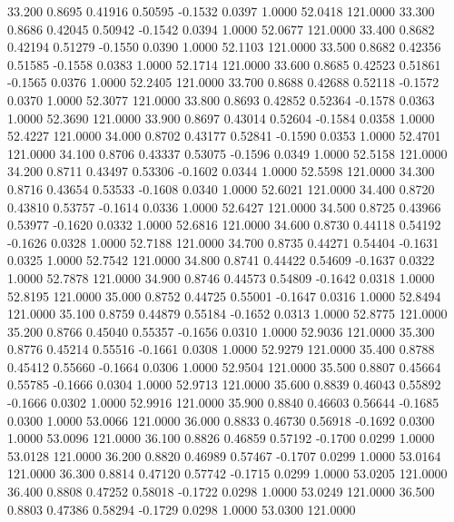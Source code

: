   33.200   0.8695   0.41916   0.50595  -0.1532   0.0397   1.0000  52.0418 121.0000
  33.300   0.8686   0.42045   0.50942  -0.1542   0.0394   1.0000  52.0677 121.0000
  33.400   0.8682   0.42194   0.51279  -0.1550   0.0390   1.0000  52.1103 121.0000
  33.500   0.8682   0.42356   0.51585  -0.1558   0.0383   1.0000  52.1714 121.0000
  33.600   0.8685   0.42523   0.51861  -0.1565   0.0376   1.0000  52.2405 121.0000
  33.700   0.8688   0.42688   0.52118  -0.1572   0.0370   1.0000  52.3077 121.0000
  33.800   0.8693   0.42852   0.52364  -0.1578   0.0363   1.0000  52.3690 121.0000
  33.900   0.8697   0.43014   0.52604  -0.1584   0.0358   1.0000  52.4227 121.0000
  34.000   0.8702   0.43177   0.52841  -0.1590   0.0353   1.0000  52.4701 121.0000
  34.100   0.8706   0.43337   0.53075  -0.1596   0.0349   1.0000  52.5158 121.0000
  34.200   0.8711   0.43497   0.53306  -0.1602   0.0344   1.0000  52.5598 121.0000
  34.300   0.8716   0.43654   0.53533  -0.1608   0.0340   1.0000  52.6021 121.0000
  34.400   0.8720   0.43810   0.53757  -0.1614   0.0336   1.0000  52.6427 121.0000
  34.500   0.8725   0.43966   0.53977  -0.1620   0.0332   1.0000  52.6816 121.0000
  34.600   0.8730   0.44118   0.54192  -0.1626   0.0328   1.0000  52.7188 121.0000
  34.700   0.8735   0.44271   0.54404  -0.1631   0.0325   1.0000  52.7542 121.0000
  34.800   0.8741   0.44422   0.54609  -0.1637   0.0322   1.0000  52.7878 121.0000
  34.900   0.8746   0.44573   0.54809  -0.1642   0.0318   1.0000  52.8195 121.0000
  35.000   0.8752   0.44725   0.55001  -0.1647   0.0316   1.0000  52.8494 121.0000
  35.100   0.8759   0.44879   0.55184  -0.1652   0.0313   1.0000  52.8775 121.0000
  35.200   0.8766   0.45040   0.55357  -0.1656   0.0310   1.0000  52.9036 121.0000
  35.300   0.8776   0.45214   0.55516  -0.1661   0.0308   1.0000  52.9279 121.0000
  35.400   0.8788   0.45412   0.55660  -0.1664   0.0306   1.0000  52.9504 121.0000
  35.500   0.8807   0.45664   0.55785  -0.1666   0.0304   1.0000  52.9713 121.0000
  35.600   0.8839   0.46043   0.55892  -0.1666   0.0302   1.0000  52.9916 121.0000
  35.900   0.8840   0.46603   0.56644  -0.1685   0.0300   1.0000  53.0066 121.0000
  36.000   0.8833   0.46730   0.56918  -0.1692   0.0300   1.0000  53.0096 121.0000
  36.100   0.8826   0.46859   0.57192  -0.1700   0.0299   1.0000  53.0128 121.0000
  36.200   0.8820   0.46989   0.57467  -0.1707   0.0299   1.0000  53.0164 121.0000
  36.300   0.8814   0.47120   0.57742  -0.1715   0.0299   1.0000  53.0205 121.0000
  36.400   0.8808   0.47252   0.58018  -0.1722   0.0298   1.0000  53.0249 121.0000
  36.500   0.8803   0.47386   0.58294  -0.1729   0.0298   1.0000  53.0300 121.0000
